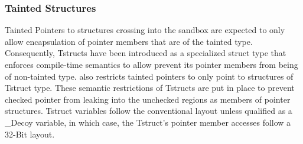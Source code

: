 \subsubsection{\textbf{Tainted Structures}}
Tainted Pointers to structures crossing into the sandbox are expected to only allow encapsulation of pointer members that are of the tainted type. Consequently, Tstructs have been introduced as a specialized struct type that enforces compile-time semantics to allow prevent its pointer members from being of non-tainted type. \systemname also restricts tainted pointers to only point to structures of Tstruct type. These semantic restrictions of Tstructs are put in place to prevent checked pointer from leaking into the unchecked regions as members of pointer structures. Tstruct variables follow the conventional layout unless qualified as a \_Decoy variable, in which case, the Tstruct's pointer member accesses follow a 32-Bit layout. 
\fi
